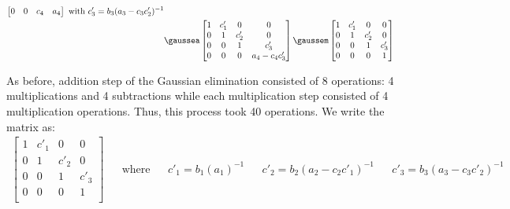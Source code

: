 \begin{align*}
\begin{bmatrix}
        0 & 0 & c_4 & a_4 \\
    \end{bmatrix} \text{ with } c'_3 = b_3(a_3 - c_3c'_2)^{-1} \\
    &\gaussea \begin{bmatrix}
        1 & c'_1 & 0 & 0 \\
        0 & 1 & c'_2 & 0 \\
        0 & 0 & 1 & c'_3 \\
        0 & 0 & 0 & a_4 - c_4c'_3 \\
    \end{bmatrix} \gaussem \begin{bmatrix}
        1 & c'_1 & 0 & 0 \\
        0 & 1 & c'_2 & 0 \\
        0 & 0 & 1 & c'_3 \\
        0 & 0 & 0 & 1 \\
    \end{bmatrix}
\end{align*}

As before, addition step of the Gaussian elimination consisted of 8 operations: 4 multiplications and 4 subtractions while each multiplication step consisted of 4 multiplication operations. Thus, this process took 40 operations. %
We write the matrix as:
\begin{align*}
    \begin{bmatrix}
        1 & c'_1 & 0 & 0 \\
        0 & 1 & c'_2 & 0 \\
        0 & 0 & 1 & c'_3 \\
        0 & 0 & 0 & 1 \\
    \end{bmatrix} & & \text{where} & & c'_1 = b_1(a_1)^{-1} & & c'_2 = b_2(a_2 - c_2c'_1)^{-1} & & c'_3 = b_3(a_3 - c_3c'_2)^{-1} \\
\end{align*}

